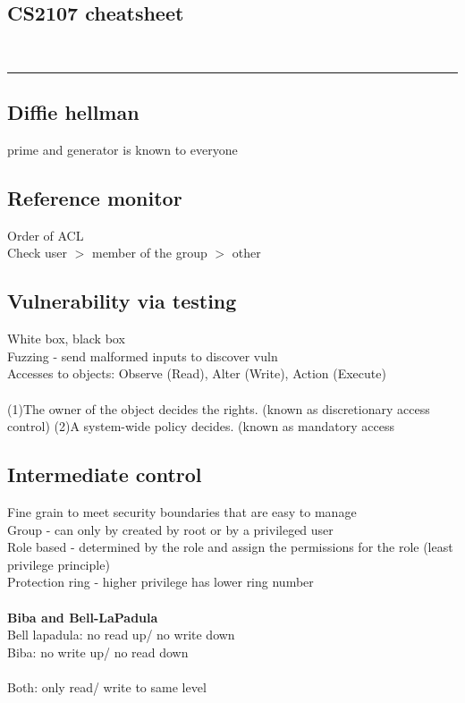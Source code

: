 \documentclass[11pt]{article}
\begin{document}
\setlength{\columnsep}{1cm}
\begin{multicols*}{3}
\section*{CS2107 cheatsheet}\\
{\color{Purple} \rule{\linewidth}{0.5mm} }
\subsection*{Diffie hellman}
prime and generator is known to everyone
\subsection*{Reference monitor}
Order of ACL\\
Check user $>$ member of the group $>$ other
\subsection*{Vulnerability via testing}
White box, black box\\
Fuzzing - send malformed inputs to discover vuln
\\
Accesses to objects: Observe (Read), Alter (Write), Action (Execute)\\
\\
(1)The owner of the object decides the rights. (known as 
discretionary access control)
(2)A system-wide policy decides.  (known as mandatory access 
\subsection*{ Intermediate control}
Fine grain to meet security boundaries that are easy to manage\\
Group - can only by created by root or by a privileged user\\
Role based - determined by the role and assign the permissions for the role (least privilege principle)\\
Protection ring - higher privilege has lower ring number\\
\\
\textrm{\textbf{ Biba and Bell-LaPadula}}\\
Bell lapadula: no read up/ no write down\\
Biba: no write up/ no read down\\
\\
Both: only read/ write to same level\\

\end{multicols*}
\end{document}
